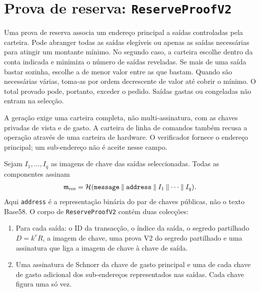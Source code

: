 \section{Prova de reserva: \texttt{ReserveProofV2}}
\label{subsec:proofs-minimum-balance-reserveproof}

Uma prova de reserva associa um endereço principal a saídas controladas pela
carteira. Pode abranger todas as saídas elegíveis ou apenas as saídas
necessárias para atingir um montante mínimo. No segundo caso, a carteira
escolhe dentro da conta indicada e minimiza o número de saídas reveladas. Se
mais de uma saída bastar sozinha, escolhe a de menor valor entre as que bastam.
Quando são necessárias várias, toma-as por ordem decrescente de valor até
cobrir o mínimo. O total provado pode, portanto, exceder o pedido. Saídas gastas ou congeladas não entram na selecção.

%
A geração exige uma carteira completa, não multi-assinatura, com as chaves
privadas de vista e de gasto. A carteira de linha de comandos também recusa a
operação através de uma carteira de hardware. O verificador fornece o endereço
principal; um sub-endereço não é aceite nesse campo.

Sejam \(I_1,\ldots,I_q\) as imagens de chave das saídas seleccionadas. Todas
as componentes assinam
\begin{align*}
 \mathfrak m_{\rm res}=\mathcal H(
 \texttt{message}\mathbin\|\texttt{address}\mathbin\|I_1\mathbin\|\cdots
 \mathbin\|I_q).
\end{align*}
Aqui \texttt{address} é a representação binária do par de chaves públicas,
não o texto Base58. O corpo de \texttt{ReserveProofV2} contém duas colecções:

\begin{enumerate}
 \item Para cada saída: o ID da transacção, o índice da saída, o segredo
 partilhado \(D=k^vR\), a imagem de chave, uma prova V2 do segredo partilhado
 e uma assinatura que liga a imagem de chave à chave de saída.

 \item Uma assinatura de Schnorr da chave de gasto principal e uma de cada
 chave de gasto adicional dos sub-endereços representados nas saídas. Cada
 chave figura uma só vez.
\end{enumerate}

